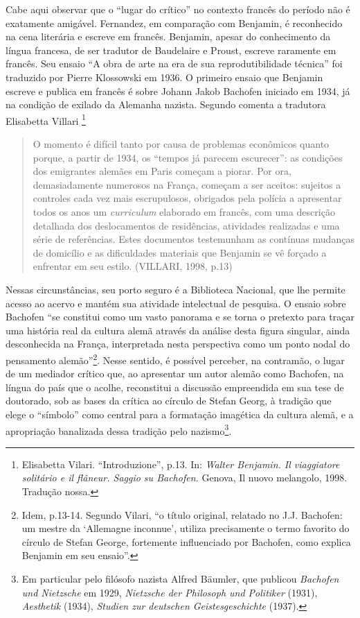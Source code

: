 Cabe aqui observar que o ``lugar do crítico'' no contexto francês do
período não é exatamente amigável. Fernandez, em comparação com
Benjamin, é reconhecido na cena literária e escreve em francês.
Benjamin, apesar do conhecimento da língua francesa, de ser tradutor de
Baudelaire e Proust, escreve raramente em francês. Seu ensaio ``A obra
de arte na era de sua reprodutibilidade técnica'' foi traduzido por
Pierre Klossowski em 1936. O primeiro ensaio que Benjamin escreve e
publica em francês é sobre Johann Jakob Bachofen iniciado em 1934, já na
condição de exilado da Alemanha nazista. Segundo comenta a tradutora
Elisabetta Villari \footnote{Elisabetta Vilari. ``Introduzione'', p.13.
  In: \emph{Walter Benjamin. Il viaggiatore solitário e il flâneur.
  Saggio su Bachofen.} Genova, Il nuovo melangolo, 1998. Tradução nossa.}

\begin{quote}
O momento é difícil tanto por causa de problemas econômicos quanto
porque, a partir de 1934, os ``tempos já parecem escurecer'': as
condições dos emigrantes alemães em Paris começam a piorar. Por ora,
demasiadamente numerosos na França, começam a ser aceitos: sujeitos a
controles cada vez mais escrupulosos, obrigados pela polícia a
apresentar todos os anos um \emph{curriculum} elaborado em francês, com
uma descrição detalhada dos deslocamentos de residências, atividades
realizadas e uma série de referências. Estes documentos testemunham as
contínuas mudanças de domicílio e as dificuldades materiais que Benjamin
se vê forçado a enfrentar em seu estilo. (VILLARI, 1998, p.13)
\end{quote}

Nessas circunstâncias, seu porto seguro é a Biblioteca Nacional, que lhe
permite acesso ao acervo e mantém sua atividade intelectual de pesquisa.
O ensaio sobre Bachofen ``se constitui como um vasto panorama e se torna
o pretexto para traçar uma história real da cultura alemã através da
análise desta figura singular, ainda desconhecida na França,
interpretada nesta perspectiva como um ponto nodal do pensamento
alemão''\footnote{Idem, p.13-14. Segundo Vilari, ``o título original,
  relatado no J.J. Bachofen: um mestre da `Allemagne inconnue', utiliza
  precisamente o termo favorito do círculo de Stefan George, fortemente
  influenciado por Bachofen, como explica Benjamin em seu ensaio''.}.
Nesse sentido, é possível perceber, na contramão, o lugar de um mediador
crítico que, ao apresentar um autor alemão como Bachofen, na língua do
país que o acolhe, reconstitui a discussão empreendida em sua tese de
doutorado, sob as bases da crítica ao círculo de Stefan Georg, à
tradição que elege o ``símbolo'' como central para a formatação
imagética da cultura alemã, e a apropriação banalizada dessa tradição
pelo nazismo\footnote{Em particular pelo filósofo nazista Alfred
  Bäumler, que publicou \emph{Bachofen und Nietzsche} em 1929,
  \emph{Nietzsche der Philosoph und Politiker} (1931), \emph{Aesthetik}
  (1934), \emph{Studien zur deutschen Geistesgeschichte} (1937).}.

